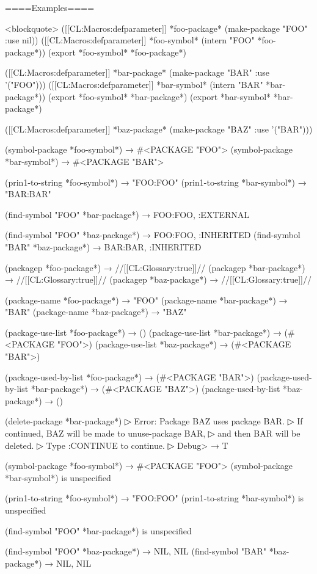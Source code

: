 ====Examples====

<blockquote> ([[CL:Macros:defparameter]] *foo-package* (make-package "FOO" :use nil)) ([[CL:Macros:defparameter]] *foo-symbol* (intern "FOO" *foo-package*)) (export *foo-symbol* *foo-package*)

([[CL:Macros:defparameter]] *bar-package* (make-package "BAR" :use '("FOO"))) ([[CL:Macros:defparameter]] *bar-symbol* (intern "BAR" *bar-package*)) (export *foo-symbol* *bar-package*) (export *bar-symbol* *bar-package*)

([[CL:Macros:defparameter]] *baz-package* (make-package "BAZ" :use '("BAR")))

(symbol-package *foo-symbol*) → #<PACKAGE "FOO"> (symbol-package *bar-symbol*) → #<PACKAGE "BAR">

(prin1-to-string *foo-symbol*) → "FOO:FOO" (prin1-to-string *bar-symbol*) → "BAR:BAR"

(find-symbol "FOO" *bar-package*) → FOO:FOO, :EXTERNAL

(find-symbol "FOO" *baz-package*) → FOO:FOO, :INHERITED (find-symbol "BAR" *baz-package*) → BAR:BAR, :INHERITED

(packagep *foo-package*) → //[[CL:Glossary:true]]// (packagep *bar-package*) → //[[CL:Glossary:true]]// (packagep *baz-package*) → //[[CL:Glossary:true]]//

(package-name *foo-package*) → "FOO" (package-name *bar-package*) → "BAR" (package-name *baz-package*) → "BAZ"

(package-use-list *foo-package*) → () (package-use-list *bar-package*) → (#<PACKAGE "FOO">) (package-use-list *baz-package*) → (#<PACKAGE "BAR">)

(package-used-by-list *foo-package*) → (#<PACKAGE "BAR">) (package-used-by-list *bar-package*) → (#<PACKAGE "BAZ">) (package-used-by-list *baz-package*) → ()

(delete-package *bar-package*)
▷ Error: Package BAZ uses package BAR.
▷ If continued, BAZ will be made to unuse-package BAR,
▷ and then BAR will be deleted.
▷ Type :CONTINUE to continue.
▷ Debug>  → T

(symbol-package *foo-symbol*) → #<PACKAGE "FOO"> (symbol-package *bar-symbol*) is unspecified

(prin1-to-string *foo-symbol*) → "FOO:FOO" (prin1-to-string *bar-symbol*) is unspecified

(find-symbol "FOO" *bar-package*) is unspecified

(find-symbol "FOO" *baz-package*) → NIL, NIL (find-symbol "BAR" *baz-package*) → NIL, NIL

